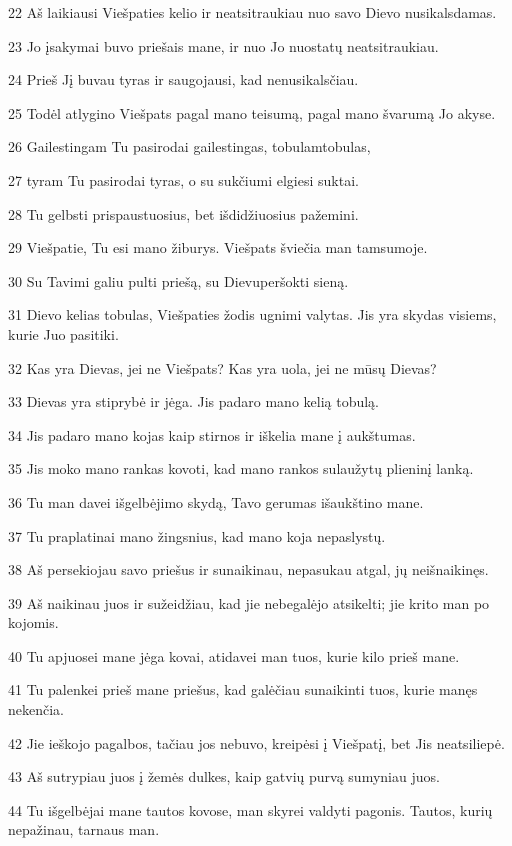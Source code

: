 \par 22 Aš laikiausi Viešpaties kelio ir neatsitraukiau nuo savo Dievo nusikalsdamas. 
\par 23 Jo įsakymai buvo priešais mane, ir nuo Jo nuostatų neatsitraukiau. 
\par 24 Prieš Jį buvau tyras ir saugojausi, kad nenusikalsčiau. 
\par 25 Todėl atlygino Viešpats pagal mano teisumą, pagal mano švarumą Jo akyse. 
\par 26 Gailestingam Tu pasirodai gailestingas, tobulam­tobulas, 
\par 27 tyram Tu pasirodai tyras, o su sukčiumi elgiesi suktai. 
\par 28 Tu gelbsti prispaustuosius, bet išdidžiuosius pažemini. 
\par 29 Viešpatie, Tu esi mano žiburys. Viešpats šviečia man tamsumoje. 
\par 30 Su Tavimi galiu pulti priešą, su Dievu­peršokti sieną. 
\par 31 Dievo kelias tobulas, Viešpaties žodis ugnimi valytas. Jis yra skydas visiems, kurie Juo pasitiki. 
\par 32 Kas yra Dievas, jei ne Viešpats? Kas yra uola, jei ne mūsų Dievas? 
\par 33 Dievas yra stiprybė ir jėga. Jis padaro mano kelią tobulą. 
\par 34 Jis padaro mano kojas kaip stirnos ir iškelia mane į aukštumas. 
\par 35 Jis moko mano rankas kovoti, kad mano rankos sulaužytų plieninį lanką. 
\par 36 Tu man davei išgelbėjimo skydą, Tavo gerumas išaukštino mane. 
\par 37 Tu praplatinai mano žingsnius, kad mano koja nepaslystų. 
\par 38 Aš persekiojau savo priešus ir sunaikinau, nepasukau atgal, jų neišnaikinęs. 
\par 39 Aš naikinau juos ir sužeidžiau, kad jie nebegalėjo atsikelti; jie krito man po kojomis. 
\par 40 Tu apjuosei mane jėga kovai, atidavei man tuos, kurie kilo prieš mane. 
\par 41 Tu palenkei prieš mane priešus, kad galėčiau sunaikinti tuos, kurie manęs nekenčia. 
\par 42 Jie ieškojo pagalbos, tačiau jos nebuvo, kreipėsi į Viešpatį, bet Jis neatsiliepė. 
\par 43 Aš sutrypiau juos į žemės dulkes, kaip gatvių purvą sumyniau juos. 
\par 44 Tu išgelbėjai mane tautos kovose, man skyrei valdyti pagonis. Tautos, kurių nepažinau, tarnaus man. 
